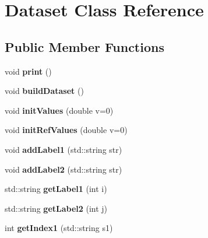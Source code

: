 \hypertarget{classDataset}{\section{Dataset Class Reference}
\label{classDataset}
}
\subsection*{Public Member Functions}
\begin{DoxyCompactItemize}
\item 
\hypertarget{classDataset_a8feaf2bb311910ab4d99d2e4bf1463b9}{void {\bfseries print} ()}\label{classDataset_a8feaf2bb311910ab4d99d2e4bf1463b9}

\item 
\hypertarget{classDataset_ac60d60df61e67a22b131642ab4dd06d4}{void {\bfseries build\-Dataset} ()}\label{classDataset_ac60d60df61e67a22b131642ab4dd06d4}

\item 
\hypertarget{classDataset_a9a50f1d277ee5fbd065e5e99ebe5b40b}{void {\bfseries init\-Values} (double v=0)}\label{classDataset_a9a50f1d277ee5fbd065e5e99ebe5b40b}

\item 
\hypertarget{classDataset_a6ac9666627e5f9d96660faff51b8bd8d}{void {\bfseries init\-Ref\-Values} (double v=0)}\label{classDataset_a6ac9666627e5f9d96660faff51b8bd8d}

\item 
\hypertarget{classDataset_a4b062bc0218c18b32e266d02b67ee8dd}{void {\bfseries add\-Label1} (std\-::string str)}\label{classDataset_a4b062bc0218c18b32e266d02b67ee8dd}

\item 
\hypertarget{classDataset_a7c4c161be1a352682d64a7a829366f4a}{void {\bfseries add\-Label2} (std\-::string str)}\label{classDataset_a7c4c161be1a352682d64a7a829366f4a}

\item 
\hypertarget{classDataset_a9a3da37b8e90e79207ee1e50ce22f953}{std\-::string {\bfseries get\-Label1} (int i)}\label{classDataset_a9a3da37b8e90e79207ee1e50ce22f953}

\item 
\hypertarget{classDataset_acf9e3bb76f7f220f2f4feeeff6841ac7}{std\-::string {\bfseries get\-Label2} (int j)}\label{classDataset_acf9e3bb76f7f220f2f4feeeff6841ac7}

\item 
\hypertarget{classDataset_abb1dc48765980e8559e9c3e358ca91cb}{int {\bfseries get\-Index1} (std\-::string s1)}\label{classDataset_abb1dc48765980e8559e9c3e358ca91cb}


\end{DoxyCompactItemize}
